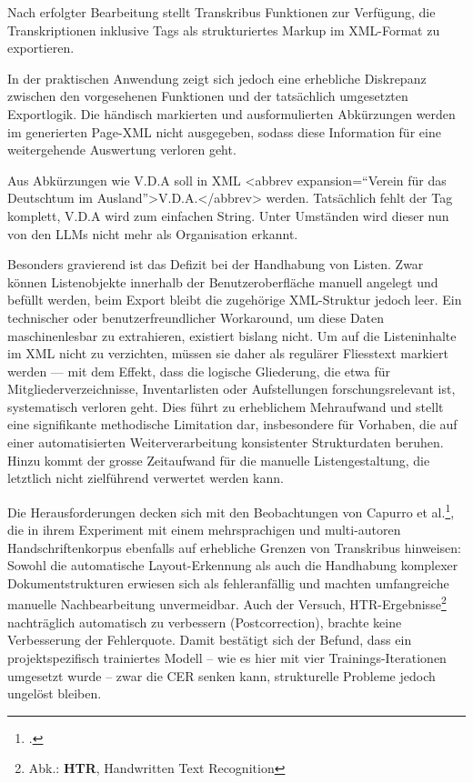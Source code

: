 \documentclass[12pt, a4paper, ngerman, bidi=default]{article}
\let\cite\footcite
\begin{document}
Nach erfolgter Bearbeitung stellt Transkribus Funktionen zur Verfügung, die Transkriptionen inklusive Tags als strukturiertes Markup im XML-Format zu exportieren.

In der praktischen Anwendung zeigt sich jedoch eine erhebliche Diskrepanz zwischen den vorgesehenen Funktionen und der tatsächlich umgesetzten Exportlogik. Die händisch markierten und ausformulierten Abkürzungen werden im generierten Page-XML nicht ausgegeben, sodass diese Information für eine weitergehende Auswertung verloren geht. 

Aus Abkürzungen wie V.D.A soll in XML \colorbox{VeryLightGray}{\textless abbrev expansion=\enquote{Verein für das Deutschtum im Ausland}\textgreater V.D.A.\textless /abbrev\textgreater} werden. Tatsächlich fehlt der Tag komplett, V.D.A wird zum einfachen String. Unter Umständen wird dieser nun von den LLMs nicht mehr als Organisation erkannt. 

Besonders gravierend ist das Defizit bei der Handhabung von Listen. Zwar können Listenobjekte innerhalb der Benutzeroberfläche manuell angelegt und befüllt werden, beim Export bleibt die zugehörige XML-Struktur jedoch leer. Ein technischer oder benutzerfreundlicher Workaround, um diese Daten maschinenlesbar zu extrahieren, existiert bislang nicht. Um auf die Listeninhalte im XML nicht zu verzichten, müssen sie daher als regulärer Fliesstext markiert werden — mit dem Effekt, dass die logische Gliederung, die etwa für Mitgliederverzeichnisse, Inventarlisten oder Aufstellungen forschungsrelevant ist, systematisch verloren geht. Dies führt zu erheblichem Mehraufwand und stellt eine signifikante methodische Limitation dar, insbesondere für Vorhaben, die auf einer automatisierten Weiterverarbeitung konsistenter Strukturdaten beruhen. Hinzu kommt der grosse Zeitaufwand für die manuelle Listengestaltung, die letztlich nicht zielführend verwertet werden kann.

Die Herausforderungen decken sich mit den Beobachtungen von Capurro et al.\cite[][]{capurro_experimenting_2023}, die in ihrem Experiment mit einem mehrsprachigen und multi-autoren Handschriftenkorpus ebenfalls auf erhebliche Grenzen von Transkribus hinweisen: Sowohl die automatische Layout-Erkennung als auch die Handhabung komplexer Dokumentstrukturen erwiesen sich als fehleranfällig und machten umfangreiche manuelle Nachbearbeitung unvermeidbar. Auch der Versuch, HTR-Ergebnisse\footnote{Abk.: \textbf{HTR}, Handwritten Text Recognition} nachträglich automatisch zu verbessern (Postcorrection), brachte keine Verbesserung der Fehlerquote. Damit bestätigt sich der Befund, dass ein projektspezifisch trainiertes Modell – wie es hier mit vier Trainings-Iterationen umgesetzt wurde – zwar die CER senken kann, strukturelle Probleme jedoch ungelöst bleiben.
\end{document}
